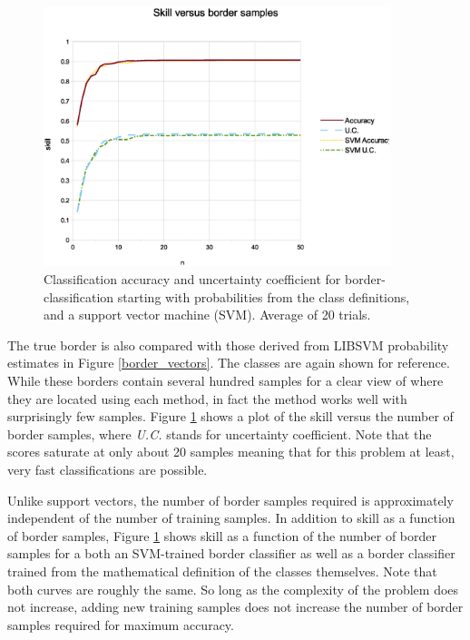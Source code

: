\begin{figure}
\includegraphics[width=0.9\textwidth]{skill_vs_nb}
\caption{Classification accuracy and uncertainty coefficient for border-classification starting with probabilities from the class definitions, and a support vector machine (SVM). Average of 20 trials.}
\label{skill_v_nb}
\end{figure}

The true border is also compared with those derived from LIBSVM
probability estimates in Figure \ref{border_vectors}.
The classes are again shown for reference.
While these borders contain several hundred samples for a clear view of where
they are located using each method, in fact the method works well with
surprisingly few samples.  Figure \ref{skill_v_nb} shows a plot of the skill
versus the number of border samples, where {\it U.C.} stands for
uncertainty coefficient. Note that the scores saturate at only about 20
samples meaning that for this problem at least, very fast classifications are
possible.

Unlike support vectors, the number of border samples required is approximately
independent of the number of training samples.
In addition to skill as a function of border samples,
Figure \ref{skill_v_nb} shows skill as a function of the number of border 
samples for a both an SVM-trained border classifier as well as
a border classifier trained from the mathematical definition of the 
classes themselves.
Note that both curves are roughly the same.
So long as the complexity of
the problem does not increase, adding new training samples does not increase
the number of border samples required for maximum accuracy.

